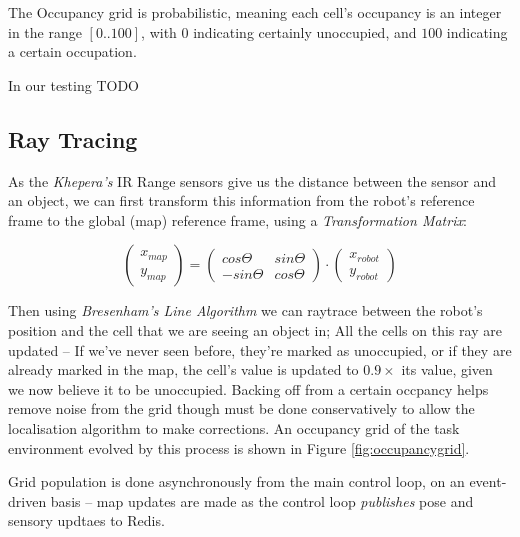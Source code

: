 \documentclass[11pt, a4paper]{article}
\begin{document}
The Occupancy grid is probabilistic, meaning each cell's occupancy is an integer in the range 
${[0..100]}$, with $0$ indicating certainly unoccupied, and $100$ indicating a certain occupation.

In our testing TODO

\subsection{Ray Tracing}

As the \textit{Khepera's} IR Range sensors give us the distance between the sensor and an object,
we can first transform this information from the robot's reference frame to the global (map)
reference frame, using a \textit{Transformation Matrix}:

\begin{equation}
  \begin{pmatrix}
    x_{map} \\
    y_{map}
  \end{pmatrix} = 
  \begin{pmatrix} 
    cos\Theta & sin\Theta \\
    -sin\Theta & cos\Theta
  \end{pmatrix}
  \cdot
  \begin{pmatrix}
    x_{robot} \\
    y_{robot}
  \end{pmatrix}
\end{equation}

Then using \textit{Bresenham's Line Algorithm} \cite{raytracealgo} we can raytrace between the
robot's position and the cell that we are seeing an object in; All the cells on this ray are 
updated -- If we've never seen before, they're marked as unoccupied, or if they are already 
marked in the map, the cell's value is updated to $0.9\times$ its value, given we now believe
it to be unoccupied. Backing off from a certain occpancy helps remove noise from the grid though
must be done conservatively to allow the localisation algorithm to make corrections.
An occupancy grid of the task environment evolved by this process is shown 
in Figure \ref{fig:occupancygrid}.

Grid population is done asynchronously from the main control loop, on an event-driven basis --
map updates are made as the control loop \textit{publishes} pose and sensory updtaes to Redis.
\end{document}
